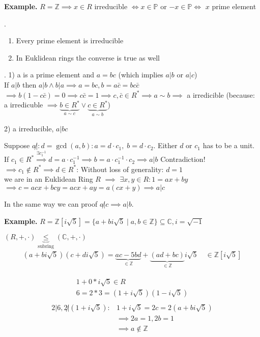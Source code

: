 \textbf{Example.}
$R = \mathbb{Z} \implies x \in R$ irreducible $\iff x \in \mathbb{P}$ or $-x \in \mathbb{P} \iff $ $x$ prime element

\Theorem.
\begin{enumerate}
  \item Every prime element is irreducible
  \item In Euklidean rings the converse is true as well
\end{enumerate}

\Proof.
1) a is a prime element and $a = bc$ (which implies $a |b$ or $a|c$)\\
If $a|b$ then $a|b \land b|a \implies a = bc, b = a\bar{c} = b c\bar{c}$\\
$\implies b(1-c\bar{c}) = 0 \implies c\bar{c} = 1 \implies c, \bar{c} \in R^{*} 
\implies a \sim b \implies$ a irredicible
(because: a irredicuble $\implies \underbrace{b \in R^{*}}_{a \sim c} \lor \underbrace{c \in R^{*}}_{a \sim b}$)

2) a irreducible, $a|bc$ 

Suppose $a \not|: d = \gcd(a,b): a = d\cdot c_1,\; b = d\cdot c_2$.
Either $d$ or $c_1$ has to be a unit. 
If $c_1 \in R^{*} \stackrel{\exists c_1^{-1}}{\implies} d = a\cdot c_1^{-1} \implies b = a \cdot c_1^{-1} \cdot c_2 \implies a |b$ Contradiction! \\
$\implies c_1 \not\in R^{*} \implies d \in R^{*}$: 
Without loss of generality: $d = 1$\\
we are in an Euklidean Ring $R$ $\implies$ $\exists x,y \in R: 1 = ax + by$ \\
$\implies c = acx + bcy = acx + ay = a (cx+y) \implies a|c$

In the same way we can proof $a\not|c \implies a|b$.

\textbf{Example.}
$R = \mathbb{Z} [i \sqrt{5}] = \{a+bi \sqrt{5} \mid a,b \in \mathbb{Z} \} \subseteq \mathbb{C}, i = \sqrt{-1}$

$(R,+,\cdot) \underbrace{\leq}_{\text{subring}} (\mathbb{C}, +,\cdot)$
\begin{align*}
  (a+bi \sqrt{5}) (c+di\sqrt{5}) = 
    \underbrace{ac - 5bd}_{\in \mathbb{Z}} + \underbrace{(ad+bc)}_{\in \mathbb{Z}} i\sqrt{5} \quad \in \mathbb{Z}[i\sqrt{5}]
\end{align*}

\begin{align*}
  1+0 * i\sqrt{5} \in R\\
  6 = 2*3 = (1+i\sqrt{5})(1-i\sqrt{5})\\
\end{align*}
\begin{align*}
  2|6, 2 \not| (1+i\sqrt{5}): & 1+i\sqrt{5} = 2c = 2(a+bi\sqrt{5}) \\
    & \implies 2a = 1, 2b = 1 \\
    & \implies a \not\in \mathbb{Z}
\end{align*}

